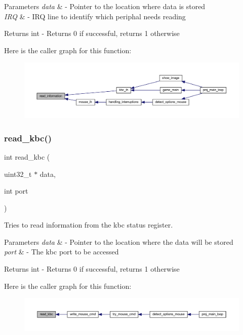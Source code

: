 \begin{DoxyParams}{Parameters}
{\em data} & -\/ Pointer to the location where data is stored \\
\hline
{\em I\+RQ} & -\/ I\+RQ line to identify which periphal needs reading \\
\hline
\end{DoxyParams}
\begin{DoxyReturn}{Returns}
int -\/ Returns 0 if successful, returns 1 otherwise 
\end{DoxyReturn}
Here is the caller graph for this function\+:
\nopagebreak
\begin{figure}[H]
\begin{center}
\leavevmode
\includegraphics[width=350pt]{group__kbc_ga51a87bc28290c19518e8bbd5423f508a_icgraph}
\end{center}
\end{figure}
\mbox{\label{group__kbc_ga77e47edd0806a3ac022baa8431f1f8b8}} 
\subsubsection{\texorpdfstring{read\+\_\+kbc()}{read\_kbc()}}
{\footnotesize\ttfamily int read\+\_\+kbc (\begin{DoxyParamCaption}\item[{uint32\+\_\+t $\ast$}]{data,  }\item[{int}]{port }\end{DoxyParamCaption})}



Tries to read information from the kbc status register. 


\begin{DoxyParams}{Parameters}
{\em data} & -\/ Pointer to the location where the data will be stored \\
\hline
{\em port} & -\/ The kbc port to be accessed \\
\hline
\end{DoxyParams}
\begin{DoxyReturn}{Returns}
int -\/ Returns 0 if successful, returns 1 otherwise 
\end{DoxyReturn}
Here is the caller graph for this function\+:
\nopagebreak
\begin{figure}[H]
\begin{center}
\leavevmode
\includegraphics[width=350pt]{group__kbc_ga77e47edd0806a3ac022baa8431f1f8b8_icgraph}
\end{center}
\end{figure}
